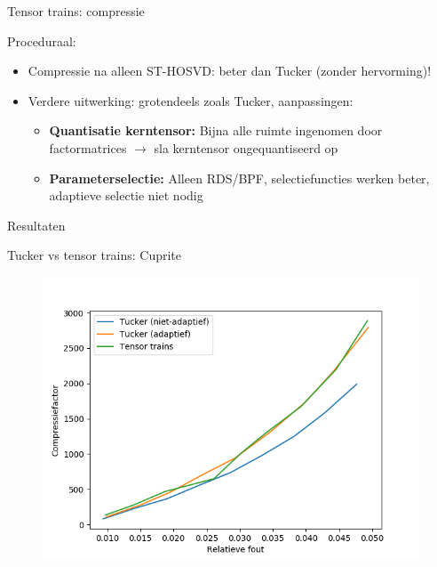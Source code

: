 \documentclass[t,12pt,dutch
\ifx\beamermode\undefined\else,\beamermode\fi
]{beamer}
\begin{document}
\begin{frame}{Tensor trains: compressie}

Proceduraal:
\begin{itemize}
\item Compressie na alleen ST-HOSVD: beter dan Tucker (zonder hervorming)!
\item Verdere uitwerking: grotendeels zoals Tucker, aanpassingen:
\begin{itemize}
\item \textbf{Quantisatie kerntensor:} Bijna alle ruimte ingenomen door factormatrices $\rightarrow$ sla kerntensor ongequantiseerd op
\item \textbf{Parameterselectie:} Alleen RDS/BPF, selectiefuncties werken beter, adaptieve selectie niet nodig
\end{itemize}
\end{itemize}

\end{frame}

\begin{frame}{}
\begin{center}
\vspace*{\fill}
\vspace*{\fill}
\Huge
Resultaten
\normalsize
\vspace*{\fill}
\end{center}
\end{frame}

\begin{frame}{Tucker vs tensor trains: Cuprite}

\begin{figure}[H]
\centering
\includegraphics[scale=0.5]{images/tucker_vs_tensor_trains_Cuprite.png}
\end{figure}

\end{frame}
\end{document}
